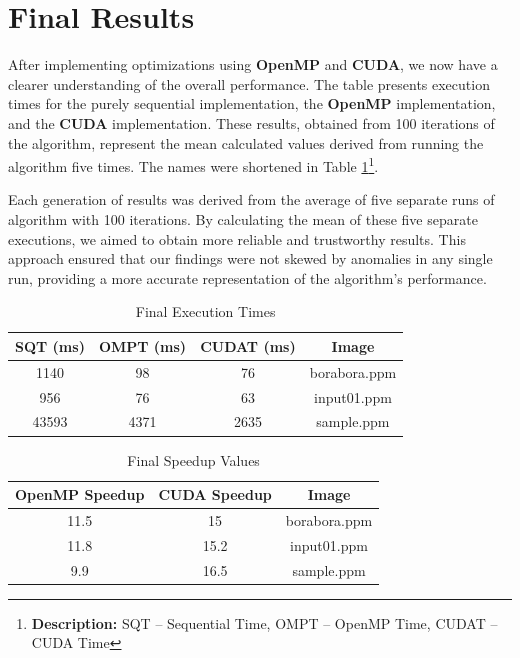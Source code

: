 \documentclass[sigconf]{acmart}
\begin{document}
\section{Final Results}
After implementing optimizations using \textbf{OpenMP} and \textbf{CUDA}, we now have a clearer understanding of the overall performance. The table presents execution times for the purely sequential implementation, the \textbf{OpenMP} implementation, and the \textbf{CUDA} implementation. These results, obtained from 100 iterations of the algorithm, represent the mean calculated values derived from running the algorithm five times. The names were shortened in Table \ref{table:final}\footnote{\textbf{Description:} SQT -- Sequential Time, OMPT -- OpenMP Time, CUDAT -- CUDA Time}.

Each generation of results was derived from the average of five separate runs of algorithm with 100 iterations. By calculating the mean of these five separate executions, we aimed to obtain more reliable and trustworthy results. This approach ensured that our findings were not skewed by anomalies in any single run, providing a more accurate representation of the algorithm's performance.

\begin{table}[h!]
\centering
\begin{tabular}{|c|c|c|c|}
\hline
\textbf{SQT (ms)} & \textbf{OMPT (ms)} & \textbf{CUDAT (ms)} & \textbf{Image} \\
\hline
1140 & 98 & 76 & borabora.ppm \\
\hline
956 & 76 & 63 & input01.ppm \\
\hline
43593 & 4371 & 2635 & sample.ppm \\
\hline
\end{tabular}
\vspace{0.2cm} %
\caption{Final Execution Times}
\label{table:final}
\end{table}

\begin{table}[h!]
\centering
\begin{tabular}{|c|c|c|}
\hline
\textbf{OpenMP Speedup} & \textbf{CUDA Speedup} & \textbf{Image} \\
\hline
11.5 & 15 & borabora.ppm \\
\hline
11.8 & 15.2 & input01.ppm \\
\hline
9.9 & 16.5 & sample.ppm \\
\hline
\end{tabular}
\vspace{0.2cm} %
\caption{Final Speedup Values}
\label{table:speeds}
\end{table}
\end{document}
